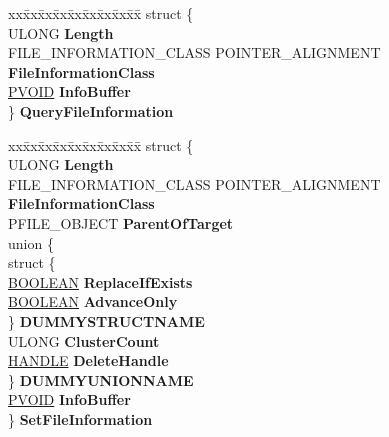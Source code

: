 \begin{DoxyCompactItemize}
\begin{tabbing}
\end{tabbing}\item 
\mbox{\label{union___f_l_t___p_a_r_a_m_e_t_e_r_s_a17f7f4765d18e78cca2d9ad6310b272f}} 
\begin{tabbing}
xx\=xx\=xx\=xx\=xx\=xx\=xx\=xx\=xx\=\kill
struct \{\\
\>ULONG {\bfseries Length}\\
\>FILE\_INFORMATION\_CLASS POINTER\_ALIGNMENT {\bfseries FileInformationClass}\\
\>\hyperlink{interfacevoid}{PVOID} {\bfseries InfoBuffer}\\
\} {\bfseries QueryFileInformation}\\

\end{tabbing}\item 
\mbox{\label{union___f_l_t___p_a_r_a_m_e_t_e_r_s_ade6c2c712f3b010f34b6e7efc9e7bfcf}} 
\begin{tabbing}
xx\=xx\=xx\=xx\=xx\=xx\=xx\=xx\=xx\=\kill
struct \{\\
\>ULONG {\bfseries Length}\\
\>FILE\_INFORMATION\_CLASS POINTER\_ALIGNMENT {\bfseries FileInformationClass}\\
\>PFILE\_OBJECT {\bfseries ParentOfTarget}\\
\>union \{\\
\>\>struct \{\\
\>\>\>\hyperlink{_processor_bind_8h_a112e3146cb38b6ee95e64d85842e380a}{BOOLEAN} {\bfseries ReplaceIfExists}\\
\>\>\>\hyperlink{_processor_bind_8h_a112e3146cb38b6ee95e64d85842e380a}{BOOLEAN} {\bfseries AdvanceOnly}\\
\>\>\} {\bfseries DUMMYSTRUCTNAME}\\
\>\>ULONG {\bfseries ClusterCount}\\
\>\>\hyperlink{interfacevoid}{HANDLE} {\bfseries DeleteHandle}\\
\>\} {\bfseries DUMMYUNIONNAME}\\
\>\hyperlink{interfacevoid}{PVOID} {\bfseries InfoBuffer}\\
\} {\bfseries SetFileInformation}\\


\end{tabbing}
\end{DoxyCompactItemize}
